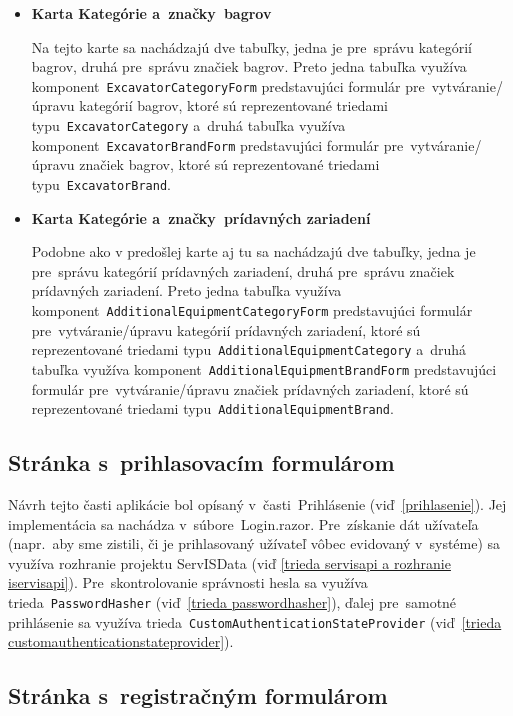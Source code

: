 \begin{itemize}
\item \textbf{Karta Kategórie a~značky~bagrov}

Na tejto karte sa nachádzajú dve tabuľky, jedna je pre~správu kategórií bagrov, druhá pre~správu značiek bagrov. Preto jedna tabuľka využíva komponent~\verb|ExcavatorCategoryForm| predstavujúci formulár pre~vytváranie/úpravu kategórií bagrov, ktoré sú reprezentované triedami typu~\verb|ExcavatorCategory| a~druhá tabuľka využíva komponent~\verb|ExcavatorBrandForm| predstavujúci formulár pre~vytváranie/úpravu značiek bagrov, ktoré sú reprezentované triedami typu~\verb|ExcavatorBrand|.

\item \textbf{Karta Kategórie a~značky~prídavných zariadení}

Podobne ako v predošlej karte aj tu sa nachádzajú dve tabuľky, jedna je pre~správu kategórií prídavných zariadení, druhá pre~správu značiek prídavných zariadení. Preto jedna tabuľka využíva komponent~\verb|AdditionalEquipmentCategoryForm| predstavujúci formulár pre~vytváranie/úpravu kategórií prídavných zariadení, ktoré sú reprezentované triedami typu~\verb|AdditionalEquipmentCategory| a~druhá tabuľka využíva komponent~\verb|AdditionalEquipmentBrandForm| predstavujúci formulár pre~vytváranie/úpravu značiek prídavných zariadení, ktoré sú reprezentované triedami typu~\verb|AdditionalEquipmentBrand|.
\end{itemize}

\subsection{Stránka s~prihlasovacím formulárom}

Návrh tejto časti aplikácie bol opísaný v~časti~Prihlásenie (viď~\ref{prihlasenie}). Jej implementácia sa nachádza v~súbore~Login.razor. Pre~získanie dát užívateľa (napr.~aby sme zistili, či je prihlasovaný užívateľ vôbec evidovaný v~systéme) sa využíva rozhranie projektu ServISData (viď \ref{trieda servisapi a rozhranie iservisapi}). Pre~skontrolovanie správnosti hesla sa využíva trieda~\verb|PasswordHasher| (viď~\ref{trieda passwordhasher}), ďalej pre~samotné prihlásenie sa využíva trieda~\verb|CustomAuthenticationStateProvider| (viď~\ref{trieda customauthenticationstateprovider}).

\subsection{Stránka s~registračným formulárom}
\label{stranka s registracnym formularom}

